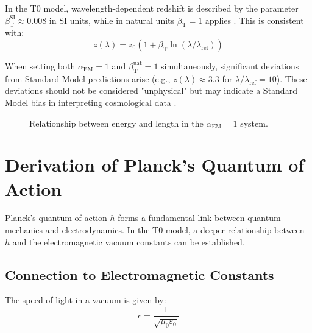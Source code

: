 \documentclass[12pt,a4paper]{article}
\newcommand{\betaT}{\beta_{\text{T}}}
\newcommand{\alphaEM}{\alpha_{\text{EM}}}
\begin{document}
	In the T0 model, wavelength-dependent redshift is described by the parameter \(\betaT^{\text{SI}} \approx 0.008\) in SI units, while in natural units \(\betaT = 1\) applies \cite{pascher_params_2025}. This is consistent with:
	\begin{equation}
		z(\lambda) = z_0 (1 + \betaT \ln(\lambda/\lambda_{\text{ref}}))
	\end{equation}
	
	When setting both \(\alphaEM = 1\) and \(\betaT^{\text{nat}} = 1\) simultaneously, significant deviations from Standard Model predictions arise (e.g., \(z(\lambda) \approx 3.3\) for \(\lambda/\lambda_{\text{ref}} = 10\)). These deviations should not be considered "unphysical" but may indicate a Standard Model bias in interpreting cosmological data \cite{pascher_alphabeta_2025}.
	
	\begin{figure}[h]
		\centering
		\caption{Relationship between energy and length in the \(\alphaEM = 1\) system.}
	\end{figure}
	
	\section{Derivation of Planck's Quantum of Action}
	
	Planck's quantum of action \(h\) forms a fundamental link between quantum mechanics and electrodynamics. In the T0 model, a deeper relationship between \(h\) and the electromagnetic vacuum constants can be established.
	
	\subsection{Connection to Electromagnetic Constants}
	
	The speed of light in a vacuum is given by:
	\begin{equation}
		c = \frac{1}{\sqrt{\mu_0 \varepsilon_0}}
	\end{equation}
	
\end{document}
